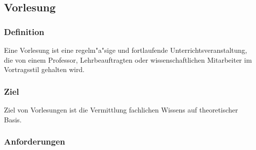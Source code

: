 \subsection{Vorlesung}

\subsubsection{Definition} 
	Eine Vorlesung ist eine regelm"a"sige und fortlaufende Unterrichtsveranstaltung, die von einem
	Professor, Lehrbeauftragten oder wissenschaftlichen Mitarbeiter im Vortragsstil gehalten wird.


\subsubsection{Ziel} 
	Ziel von Vorlesungen ist die Vermittlung fachlichen Wissens auf theoretischer Basis. 

\subsubsection{Anforderungen} \label{vorlesung:anforderungen}

